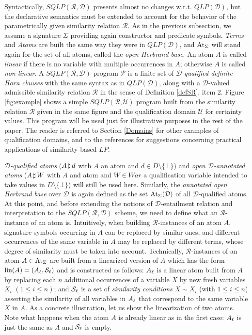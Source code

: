 \documentclass{sigplanconf}
\newcommand{\qdom}{\mathcal{D}} \newcommand{\dqdom}{D \setminus \{\bot\}} \newcommand{\bqdom}{(D \setminus \{\bot\}) \uplus \{?\}}
\newcommand{\U}{\mathcal{U}}
\newcommand{\Set}{\mathcal{S}}
\newcommand{\simrel}{\mathcal{R}}
\newcommand{\qlp}[1]{QLP({#1})} \newcommand{\slp}[2]{SLP({#1,#2})} \newcommand{\sqlp}[2]{SQLP({#1,#2})} \newcommand{\bqlp}[1]{BQLP({#1})} \newcommand{\clp}[1]{CLP({#1})}
\newcommand{\Prog}{\mathcal{P}} \newcommand{\UProg}{\mathcal{P_U}}
\theoremstyle{definition}
\theoremstyle{plain}
\begin{document}
Syntactically, $\sqlp{\simrel}{\qdom}$ presents almost no changes w.r.t. $\qlp{\qdom}$, but the declarative semantics must be extended to account for the behavior of the parametrically given similarity relation $\simrel$.  As in the previous subsection, we assume a signature $\Sigma$ providing again constructor and predicate symbols. \emph{Terms} and \emph{Atoms} are built the same way they were in $\qlp{\qdom}$, and $\mathrm{At}_{\Sigma}$ will stand again for the set of all atoms, called the \emph{open Herbrand base}. An atom $A$ is called {\em linear} if there is no variable with multiple occurrences in $A$; otherwise $A$ is called {\em non-linear}. A $\sqlp{\simrel}{\qdom}$ program $\Prog$ is a finite set of \emph{$\qdom$-qualified definite Horn clauses} with the same syntax as in $\qlp{\qdom}$, along with a $\qdom$-valued admissible similarity relation $\simrel$ in the sense of Definition \ref{defSR}, item 2. Figure \ref{fig:example} shows a simple $\sqlp{\simrel}{\U}$ program built from the similarity relation $\simrel$ given in the same figure and the qualification domain $\U$ for certainty values. This program will be used just for illustrative purposes in the rest of the paper. The reader is referred to Section \ref{Domains} for other examples of qualification domains, and to the references \cite{LSS04,MOV04} for suggestions concerning practical applications of similarity-based $LP$.

\emph{$\qdom$-qualified atoms} ($A\,\sharp\,d$ with $A$ an atom and $d \in \dqdom$) and \emph{open $\qdom$-annotated atoms} ($A\,\sharp\,W$ with $A$ and atom and $W \in War$ a qualification variable intended to take values in $\dqdom$) will still be used here. Similarly, the \emph{annotated open Herbrand base} over $\qdom$ is again defined as the set $\QAtz$ of all $\qdom$-qualified atoms. At this point, and before extending the notions of $\qdom$-entailment relation and interpretation to the $\sqlp{\simrel}{\qdom}$ scheme, we need to define what an $\simrel$-instance of an atom is.  Intuitively, when building $\simrel$-instances of an atom $A$, signature symbols occurring in $A$ can be replaced by similar ones, and different occurrences of the same variable in $A$ may be replaced by different terms, whose degree of similarity must be taken into account. Technically, $\simrel$-instances of an atom $A \in \mathrm{At}_{\Sigma}$ are built from a linearized version of $A$ which has the form $\mbox{lin}(A) = (\linear{A}, \linear{\Set})$ and is constructed as follows: $A_\ell$ is a linear atom built from $A$ by replacing each $n$ additional occurrences of a variable $X$ by new fresh variables $X_i$ $(1 \leq i \leq n)$; and $\linear{\Set}$ is a set of \emph{similarity conditions} $X \sim X_i$ (with $1 \le i \le n$) asserting the similarity of all variables in $A_\ell$ that correspond to the same variable $X$ in $A$. As a concrete illustration, let us show the linearization of two atoms. Note what happens when the atom $A$ is already linear as in the first case: $A_\ell$ is just the same as $A$ and $\linear{\Set}$ is empty.
\end{document}
